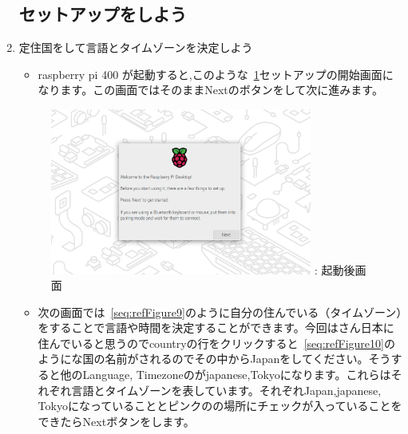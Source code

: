 \documentclass[a4paper,12pt]{jarticle}
\begin{document}
\begin{enumerate}
  \subsection{\theExercise  セットアップをしよう}
  \item  定住国をして言語とタイムゾーンを決定しよう
        \begin{itemize}
          \item
                raspberry pi 400 が起動すると,このような~\ref{seq:refFigure8}セットアップの開始画面になります。この画面ではそのままNextのボタンをして次に進みます。
        \end{itemize} 
        \begin{figure}[h]
          \centering
          \begin{minipage}{5.222cm}
          {\upshape
            \includegraphics[width=8.613cm]{sw_image01.png}
            \newline
            {\theFigure\label{seq:refFigure8}}:
            起動後画面
          }
        \end{minipage}
        \end{figure}

        \begin{itemize}
          \item
              次の画面では~\ref{seq:refFigure9}のように自分の住んでいる（タイムゾーン）をすることで言語や時間を決定することができます。今回はさん日本に住んでいると思うのでcountryの行をクリックすると~\ref{seq:refFigure10}のようにな国の名前がされるのでその中からJapanをしてください。そうすると他のLanguage, Timezoneのがjapanese,Tokyoになります。これらはそれぞれ言語とタイムゾーンを表しています。それぞれJapan,japanese, Tokyoになっていることとピンクのの場所にチェックが入っていることをできたらNextボタンをします。
              

\end{itemize}
\end{enumerate}
\end{document}
